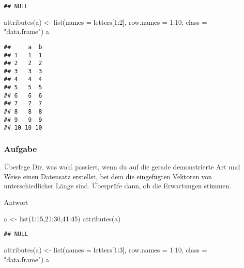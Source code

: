 \documentclass[
]{book}
\newenvironment{Shaded}{\begin{snugshade}}{\end{snugshade}}
\newcommand{\AttributeTok}[1]{\textcolor[rgb]{0.77,0.63,0.00}{#1}}
\newcommand{\DecValTok}[1]{\textcolor[rgb]{0.00,0.00,0.81}{#1}}
\newcommand{\FunctionTok}[1]{\textcolor[rgb]{0.00,0.00,0.00}{#1}}
\newcommand{\NormalTok}[1]{#1}
\newcommand{\OtherTok}[1]{\textcolor[rgb]{0.56,0.35,0.01}{#1}}
\newcommand{\SpecialCharTok}[1]{\textcolor[rgb]{0.00,0.00,0.00}{#1}}
\newcommand{\StringTok}[1]{\textcolor[rgb]{0.31,0.60,0.02}{#1}}
\begin{document}
\begin{verbatim}
## NULL
\end{verbatim}

\begin{Shaded}
\begin{Highlighting}[]
\FunctionTok{attributes}\NormalTok{(a) }\OtherTok{\textless{}{-}} \FunctionTok{list}\NormalTok{(}\AttributeTok{names =}\NormalTok{ letters[}\DecValTok{1}\SpecialCharTok{:}\DecValTok{2}\NormalTok{],}
                      \AttributeTok{row.names =} \DecValTok{1}\SpecialCharTok{:}\DecValTok{10}\NormalTok{,}
                      \AttributeTok{class =} \StringTok{"data.frame"}\NormalTok{)}
\NormalTok{a}
\end{Highlighting}
\end{Shaded}

\begin{verbatim}
##     a  b
## 1   1  1
## 2   2  2
## 3   3  3
## 4   4  4
## 5   5  5
## 6   6  6
## 7   7  7
## 8   8  8
## 9   9  9
## 10 10 10
\end{verbatim}

\hypertarget{aufgabe-6}{%
\subsubsection{Aufgabe}\label{aufgabe-6}}

Überlege Dir, was wohl passiert, wenn du auf die gerade demonstrierte Art und Weise einen Datensatz erstellst, bei dem die eingefügten Vektoren von unterschiedlicher Länge sind.
Überprüfe dann, ob die Erwartungen stimmen.

Antwort

\begin{Shaded}
\begin{Highlighting}[]
\NormalTok{a }\OtherTok{\textless{}{-}} \FunctionTok{list}\NormalTok{(}\DecValTok{1}\SpecialCharTok{:}\DecValTok{15}\NormalTok{,}\DecValTok{21}\SpecialCharTok{:}\DecValTok{30}\NormalTok{,}\DecValTok{41}\SpecialCharTok{:}\DecValTok{45}\NormalTok{)}
\FunctionTok{attributes}\NormalTok{(a)}
\end{Highlighting}
\end{Shaded}

\begin{verbatim}
## NULL
\end{verbatim}

\begin{Shaded}
\begin{Highlighting}[]
\FunctionTok{attributes}\NormalTok{(a) }\OtherTok{\textless{}{-}} \FunctionTok{list}\NormalTok{(}\AttributeTok{names =}\NormalTok{ letters[}\DecValTok{1}\SpecialCharTok{:}\DecValTok{3}\NormalTok{],}
                      \AttributeTok{row.names =} \DecValTok{1}\SpecialCharTok{:}\DecValTok{10}\NormalTok{,}
                      \AttributeTok{class =} \StringTok{"data.frame"}\NormalTok{)}
\NormalTok{a}
\end{Highlighting}
\end{Shaded}
\end{document}
